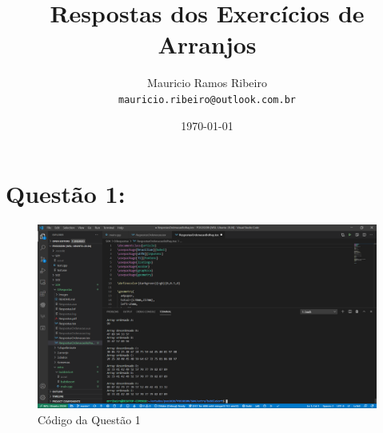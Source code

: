 \documentclass{article}
\author{
  Mauricio Ramos Ribeiro\\
  \texttt{mauricio.ribeiro@outlook.com.br}
}
\title{Respostas dos Exercícios de Arranjos}
\date{\today}
\begin{document}
\maketitle

\vspace{15mm}


\section*{Questão 1:}

\begin{figure}[h!]
  \includegraphics[scale=0.42]{BubbleSort.png}
  \caption{Código da Questão 1}
\end{figure}
\vspace{15mm}
\end{document}
